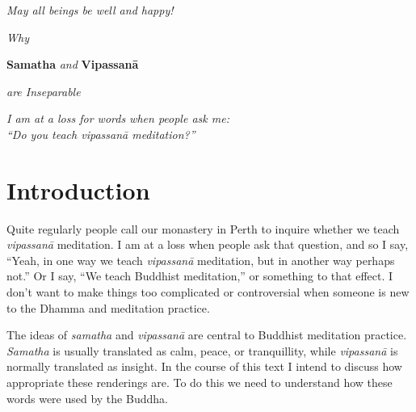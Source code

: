 \documentclass[12pt,openany]{book}
\begin{document}
\vfill

\begin{center}
\textit{May all beings be well and happy!}

\end{center}
\vfill

\newpage

\begin{center}\end{center}
\begin{center}

\vfill

{\huge \textit{Why} 

\medskip

\textbf{Samatha} \textit{and} \textbf{Vipassanā} 

\bigskip

\textit{are Inseparable}}

\vfill


\vfill
\end{center}

 \newpage

\begin{center}\end{center}
\begin{center}

\vfill

\textit{\large I am at a loss for words when people ask me: \\“Do you teach vipassanā meditation?”}

\vfill

\end{center}

\newpage
\mainmatter
\chapter*{Introduction}

Quite regularly people call our monastery in Perth to inquire whether we teach \textit{vipassanā} meditation. I am at a loss when people ask that question, and so I say, “Yeah, in one way we teach \textit{vipassanā} meditation, but in another way perhaps not.” Or I say, “We teach Buddhist meditation,” or something to that effect. I don’t want to make things too complicated or controversial when someone is new to the Dhamma and meditation practice.

The ideas of \textit{samatha} and \textit{vipassanā} are central to Buddhist meditation practice. \textit{Samatha} is usually translated as calm, peace, or tranquillity, while \textit{vipassanā} is normally translated as insight. In the course of this text I intend to discuss how appropriate these renderings are. To do this we need to understand how these words were used by the Buddha.
\end{document}
